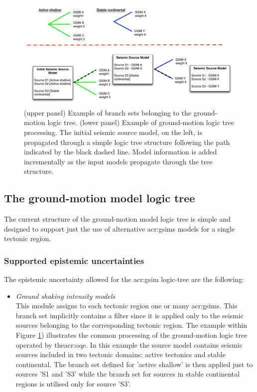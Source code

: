 %
\begin{figure}[!ht]
\centering
\includegraphics[width=\textwidth]{./Pictures/lts/logic_tree_gsim.pdf}
\caption{(upper panel) Example of branch sets belonging to the ground-motion 
logic tree. (lower panel) Example of ground-motion logic tree processing. 
The initial seismic source model, on the left,  is propagated through a simple 
logic tree structure following the path indicated by the black dashed line.
Model information is added incrementally as the input models propagate 
through the tree structure.}
\label{fig:logic_tree_gsim}
\end{figure}
%
%
\subsection{The ground-motion model logic tree}
The current structure of the ground-motion model logic tree is 
simple and designed to support just the use of alternative 
\glspl{acr:gsim} models for a single tectonic region.
%
\subsubsection{Supported epistemic uncertainties}
The epistemic uncertainty allowed for the \gls{acr:gsim} 
logic-tree are the following:
\begin{itemize}
    \item \emph{Ground shaking intensity models} \hfill \\
        This module assigns to each tectonic region one or many 
        \glspl{acr:gsim}. This branch set implicitly contains a 
        filter since it is applied only to the seismic sources 
        belonging to the corresponding tectonic region. The  
        example within Figure \ref{fig:logic_tree_gsim}) illustrates
        the common processing of the ground-motion logic tree operated
        by the\gls{acr:oqe}. In this example the source model 
        contains seismic sources included in two tectonic domains:
        active tectonics and stable continental. The branch set defined 
        for 'active shallow' is then applied just to sources 'S1 and 'S3' 
        while the branch set for sources in stable continental regions
        is utilised only for source 'S3'.
\end{itemize}
